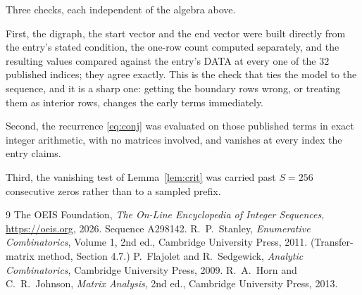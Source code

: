 \documentclass[11pt,a4paper]{article}
\theoremstyle{plain}
\theoremstyle{definition}
\begin{document}
Three checks, each independent of the algebra above.

First, the digraph, the start vector and the end vector were built directly from the
entry's stated condition, the one-row count computed separately, and the resulting values
compared against the entry's DATA at every one of the $32$ published indices; they
agree exactly. This is the check that ties the model to the sequence, and it is a sharp one:
getting the boundary rows wrong, or treating them as interior rows, changes the early terms
immediately.

Second, the recurrence \eqref{eq:conj} was evaluated on those published terms in exact
integer arithmetic, with no matrices involved, and vanishes at every index the entry claims.

Third, the vanishing test of Lemma~\ref{lem:crit} was carried past $S=256$ consecutive
zeros rather than to a sampled prefix.

\begin{thebibliography}{9}
 The OEIS Foundation, \emph{The On-Line Encyclopedia of Integer
Sequences}, \url{https://oeis.org}, 2026. Sequence A298142.
 R.~P.~Stanley, \emph{Enumerative Combinatorics}, Volume 1, 2nd ed.,
Cambridge University Press, 2011. (Transfer-matrix method, Section 4.7.)
 P.~Flajolet and R.~Sedgewick, \emph{Analytic Combinatorics}, Cambridge
University Press, 2009.
 R.~A.~Horn and C.~R.~Johnson, \emph{Matrix Analysis}, 2nd ed., Cambridge
University Press, 2013.
\end{thebibliography}
\end{document}
